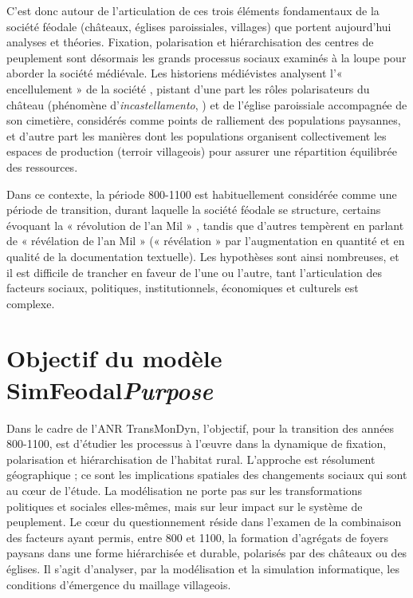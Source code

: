 {	C'est donc autour de l'articulation de ces trois éléments fondamentaux de la société féodale (châteaux, églises paroissiales, villages) que portent aujourd'hui analyses et théories.
	Fixation, polarisation et hiérarchisation des centres de peuplement sont désormais les grands processus sociaux examinés à la loupe pour aborder la société médiévale.
	Les historiens médiévistes analysent l'« encellulement » de la société \autocite{fossier_enfance_1982}, pistant d'une part les rôles polarisateurs du château (phénomène d'\textit{incastellamento},  \cite{toubert_les_1973}) et de l'église paroissiale accompagnée de son cimetière, considérés comme points de ralliement des populations paysannes, et d'autre part les manières dont les populations organisent collectivement les espaces de production (terroir villageois) pour assurer une répartition équilibrée des ressources.
	
	Dans ce contexte, la période 800-1100 est habituellement considérée comme une période de transition, durant laquelle la société féodale se structure, certains évoquant la « révolution de l'an Mil » \autocite{fossier_enfance_1982}, tandis que d'autres tempèrent en parlant de « révélation de l'an Mil » \autocite{barthelemy_societe_1993} (« révélation » par l'augmentation en quantité et en qualité de la documentation textuelle).
	Les hypothèses sont ainsi nombreuses, et il est difficile de trancher en faveur de l'une ou l'autre, tant l'articulation des facteurs sociaux, politiques, institutionnels, économiques et culturels est complexe.
}

\section[Objectif du modèle SimFeodal --  \textit{Purpose}]{Objectif du modèle SimFeodal\protect\newline \large{\textit{Purpose}}}

{\redroman
	Dans le cadre de l'ANR TransMonDyn, l'objectif, pour la transition des années 800-1100, est d'étudier les processus à l'œuvre dans la dynamique de fixation, polarisation et hiérarchisation de l'habitat rural.
	L'approche est résolument géographique ; ce sont les implications spatiales des changements sociaux qui sont au cœur de l'étude.
	La modélisation ne porte pas sur les transformations politiques et sociales elles-mêmes, mais sur leur impact sur le système de peuplement.
	Le cœur du questionnement réside dans l'examen de la combinaison des facteurs ayant permis, entre 800 et 1100, la formation d'agrégats de foyers paysans dans une forme hiérarchisée et durable, polarisés par des châteaux ou des églises.
	Il s'agit d'analyser, par la modélisation et la simulation informatique, les conditions d'émergence du maillage villageois.
}


